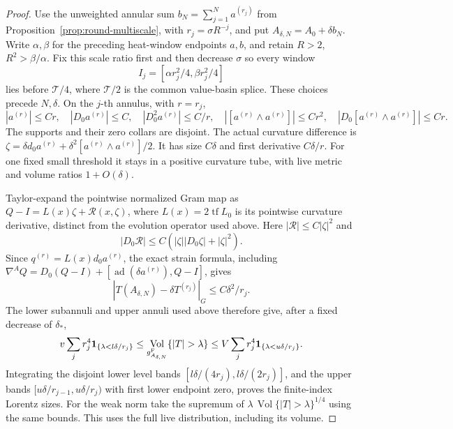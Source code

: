 \documentclass[11pt]{article}
\numberwithin{equation}{section}
\theoremstyle{definition}
\theoremstyle{remark}
\DeclareMathOperator{\Vol}{Vol}
\begin{document}
\begin{proof}
Use the unweighted annular sum
\(b_N=\sum_{j=1}^N a^{(r_j)}\) from
Proposition~\ref{prop:round-multiscale}, with
\(r_j=\sigma R^{-j}\), and put
\(A_{\delta,N}=A_0+\delta b_N\).
Write \(\alpha,\beta\) for the preceding heat-window
endpoints \(a,b\), and retain
\(R>2\), \(R^2>\beta/\alpha\).
Fix this scale ratio first and then decrease \(\sigma\)
so every window
\[
 I_j=[\alpha r_j^2/4,\beta r_j^2/4]
\]
lies before \(\mathcal T/4\), where \(\mathcal T/2\)
is the common value-basin splice. These choices precede
\(N,\delta\). On the \(j\)-th annulus, with \(r=r_j\),
\[
 |a^{(r)}|\le Cr,\quad |D_0a^{(r)}|\le C,\quad
 |D_0^2a^{(r)}|\le C/r,\quad
 |[a^{(r)}\wedge a^{(r)}]|\le Cr^2,\quad
 |D_0[a^{(r)}\wedge a^{(r)}]|\le Cr.
\]
The supports and their zero collars are disjoint.
The actual curvature difference is
\(\zeta=\delta d_0a^{(r)}
 +\delta^2[a^{(r)}\wedge a^{(r)}]/2\).
It has size \(C\delta\) and first derivative \(C\delta/r\).
For one fixed small threshold it stays in a positive
curvature tube, with live metric and volume ratios
\(1+O(\delta)\).

Taylor-expand the pointwise normalized Gram map as
\(Q-I=L(x)\zeta+\mathcal R(x,\zeta)\), where
\(L(x)=2\operatorname{tf}L_0\) is its pointwise curvature
derivative, distinct from the evolution operator used above.
Here \(|\mathcal R|\le C|\zeta|^2\) and
\[
 |D_0\mathcal R|\le
 C(|\zeta||D_0\zeta|+|\zeta|^2).
\]
Since \(q^{(r)}=L(x)d_0a^{(r)}\), the exact strain formula,
including
\(\nabla^AQ=D_0(Q-I)+[\operatorname{ad}(\delta a^{(r)}),Q-I]\),
gives
\[
 |T(A_{\delta,N})-\delta T^{(r_j)}|_G
       \le C\delta^2/r_j .
\]
The lower subannuli and upper annuli used above therefore
give, after a fixed decrease of \(\delta_*\),
\[
 v\sum_j r_j^4\mathbf1_{\{\lambda<l\delta/r_j\}}
 \le \Vol_{g^{\rm F}_{A_{\delta,N}}}\{|T|>\lambda\}
 \le V\sum_j r_j^4\mathbf1_{\{\lambda<u\delta/r_j\}} .
\]
Integrating the disjoint lower level bands
\([l\delta/(4r_j),l\delta/(2r_j)]\), and the upper
bands \([u\delta/r_{j-1},u\delta/r_j)\) with first
lower endpoint zero, proves the finite-index Lorentz sizes.
For the weak norm take the supremum of
\(\lambda\,\Vol\{|T|>\lambda\}^{1/4}\) using the same bounds.
This uses the full live distribution, including its volume.


\end{proof}
\end{document}
